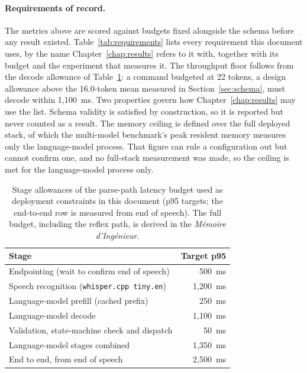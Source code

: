 \paragraph{Requirements of record.} The metrics above are scored against budgets fixed alongside the
schema before any result existed. Table~\ref{tab:requirements} lists every requirement this document
uses, by the name Chapter~\ref{chap:results} refers to it with, together with its budget and the
experiment that measures it. The throughput floor follows from the decode allowance of
Table~\ref{tab:latency-budget}: a command budgeted at 22 tokens, a design allowance above the
16.0-token mean measured in Section~\ref{sec:schema}, must decode within 1{,}100~ms. Two properties govern how Chapter~\ref{chap:results} may use the list.
Schema validity is satisfied by construction, so it is reported but never counted as a result. The
memory ceiling is defined over the full deployed stack, of which the multi-model benchmark's peak
resident memory measures only the language-model process. That figure can rule a configuration out
but cannot confirm one, and no full-stack measurement was made, so the ceiling is met for the
language-model process only.

\begin{table}[htbp]
\centering
\footnotesize
\caption[Stage latency allowances]{Stage allowances of the parse-path latency budget used as deployment constraints in this
document (p95 targets; the end-to-end row is measured from end of speech). The full budget, including the reflex path,
is derived in the \emph{M\'emoire d'Ing\'enieur}.}
\label{tab:latency-budget}
\begin{tabular}{@{}lr@{}}
\toprule
Stage & Target p95 \\
\midrule
Endpointing (wait to confirm end of speech) & 500~ms \\
Speech recognition (\texttt{whisper.cpp tiny.en}) & 1{,}200~ms \\
Language-model prefill (cached prefix) & 250~ms \\
Language-model decode & 1{,}100~ms \\
Validation, state-machine check and dispatch & 50~ms \\
\midrule
Language-model stages combined & 1{,}350~ms \\
End to end, from end of speech & 2{,}500~ms \\
\bottomrule
\end{tabular}
\end{table}

